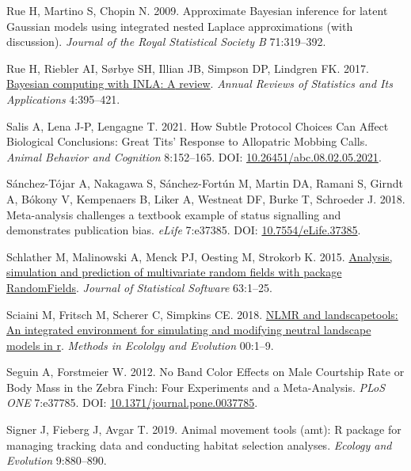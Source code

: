\documentclass[10pt,a4paper]{article}
\newlength{\cslhangindent}
\newenvironment{CSLReferences}[2] %
 {\begin{list}{}{%
  \setlength{\itemindent}{0pt}
  \setlength{\leftmargin}{0pt}
  \setlength{\parsep}{0pt}
  \ifodd #1
   \setlength{\leftmargin}{\cslhangindent}
   \setlength{\itemindent}{-1\cslhangindent}
  \fi
  \setlength{\itemsep}{#2\baselineskip}}}
 {\end{list}}
\begin{document}
\begin{CSLReferences}{1}{0}
Rue H, Martino S, Chopin N. 2009. Approximate {Bayesian} inference for latent {Gaussian} models using integrated nested {Laplace} approximations (with discussion). \emph{Journal of the Royal Statistical Society B} 71:319--392.

Rue H, Riebler AI, Sørbye SH, Illian JB, Simpson DP, Lindgren FK. 2017. \href{http://arxiv.org/abs/1604.00860}{Bayesian computing with {INLA}: {A} review}. \emph{Annual Reviews of Statistics and Its Applications} 4:395--421.

Salis A, Lena J-P, Lengagne T. 2021. How {Subtle} {Protocol} {Choices} {Can} {Affect} {Biological} {Conclusions}: {Great} {Tits}' {Response} to {Allopatric} {Mobbing} {Calls}. \emph{Animal Behavior and Cognition} 8:152--165. DOI: \href{https://doi.org/10.26451/abc.08.02.05.2021}{10.26451/abc.08.02.05.2021}.

Sánchez-Tójar A, Nakagawa S, Sánchez-Fortún M, Martin DA, Ramani S, Girndt A, Bókony V, Kempenaers B, Liker A, Westneat DF, Burke T, Schroeder J. 2018. Meta-analysis challenges a textbook example of status signalling and demonstrates publication bias. \emph{eLife} 7:e37385. DOI: \href{https://doi.org/10.7554/eLife.37385}{10.7554/eLife.37385}.

Schlather M, Malinowski A, Menck PJ, Oesting M, Strokorb K. 2015. \href{https://www.jstatsoft.org/v63/i08/}{Analysis, simulation and prediction of multivariate random fields with package {RandomFields}}. \emph{Journal of Statistical Software} 63:1--25.

Sciaini M, Fritsch M, Scherer C, Simpkins CE. 2018. \href{https://doi.org/10.1111/2041-210X.13076}{NLMR and landscapetools: An integrated environment for simulating and modifying neutral landscape models in r}. \emph{Methods in Ecololgy and Evolution} 00:1--9.

Seguin A, Forstmeier W. 2012. No {Band} {Color} {Effects} on {Male} {Courtship} {Rate} or {Body} {Mass} in the {Zebra} {Finch}: {Four} {Experiments} and a {Meta}-{Analysis}. \emph{PLoS ONE} 7:e37785. DOI: \href{https://doi.org/10.1371/journal.pone.0037785}{10.1371/journal.pone.0037785}.

Signer J, Fieberg J, Avgar T. 2019. Animal movement tools (amt): R package for managing tracking data and conducting habitat selection analyses. \emph{Ecology and Evolution} 9:880--890.


\end{CSLReferences}
\end{document}
